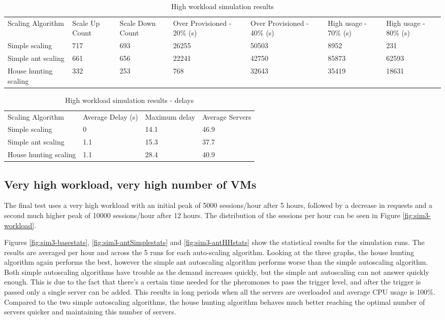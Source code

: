 \documentclass[conference]{IEEEtran}
\begin{document}
\begin{table}
\caption{High workload simulation results}
\label{table:sim2}
\begin{tabu} to\linewidth{|X[c]|X[c]|X[c]|X[c]|X[c]|X[c]|X[c]|}
\everyrow{\hline}
\hline
Scaling Algorithm & Scale Up Count & Scale Down Count & Over Provisioned - 20\% (s) & Over Provisioned - 40\% (s) & High usage - 70\% (s) & High usage - 80\% (s) \\
Simple scaling & 717 & 693 & 26255 & 50503 & 8952 & 231 \\
Simple ant scaling & 661 & 656 & 22241 & 42750 & 85873 & 62593 \\
House hunting scaling & 332 & 253 & 768 & 32643 & 35419 & 18631 \\
\end{tabu}
\end{table}

\begin{table}
\caption{High workload simulation results - delays}
\label{table:sim2-delay}
\begin{tabu} to\linewidth{|X[c]|X[c]|X[c]|X[c]|}
\everyrow{\hline}
\hline
Scaling Algorithm & Average Delay (s) & Maximum delay & Average Servers  \\
Simple scaling & 0 & 14.1 & 46.9 \\
Simple ant scaling & 1.1 & 15.3 & 37.7 \\
House hunting scaling & 1.1 & 28.4 & 40.9 \\
\end{tabu}
\end{table}

\subsection{Very high workload, very high number of VMs}

The final test uses a very high workload with an initial peak of 5000 sessions/hour after 5 hours, followed by a decrease in requests and a second much higher peak of 10000 sessions/hour after 12 hours. The distribution of the sessions per hour can be seen in Figure \ref{fig:sim3-workload}.

Figures \ref{fig:sim3-basestats}, \ref{fig:sim3-antSimplestats} and \ref{fig:sim3-antHHstats} show the statistical results for the simulation runs. The results are averaged per hour and across the 5 runs for each auto-scaling algorithm. Looking at the three graphs, the house hunting algorithm again performs the best, however the simple ant autoscaling algorithm performs worse than the simple autoscaling algorithm. Both simple autoscaling algorithms have trouble as the demand increases quickly, but the simple ant autoscaling can not answer quickly enough. This is due to the fact that there's a certain time needed for the pheromones to pass the trigger level, and after the trigger is passed only a single server can be added. This results in long periods when all the servers are overloaded and average CPU usage is 100\%. Compared to the two simple autoscaling algorithms, the house hunting algorithm behaves much better reaching the optimal number of servers quicker and maintaining this number of servers.
\end{document}

